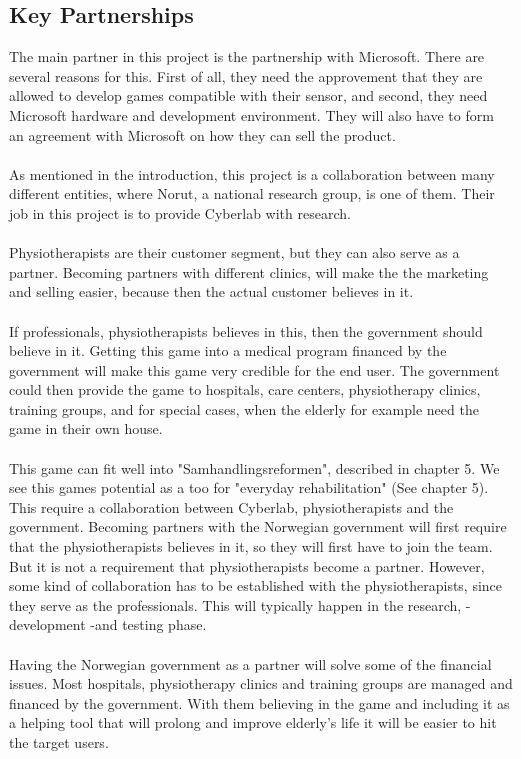 \subsection{Key Partnerships}
The main partner in this project is the partnership with Microsoft. There are several reasons for this. First of all, they need the approvement that they are allowed to develop games compatible with their sensor, and second, they need Microsoft hardware and development environment. They will also have to form an agreement with Microsoft on how they can sell the product. \\ \\ As mentioned in the introduction, this project is a collaboration between many different entities, where Norut, a national research group, is one of them. Their job in this project is to provide Cyberlab with research. \\ \\ Physiotherapists are their customer segment, but they can also serve as a partner. Becoming partners with different clinics, will make the the marketing and selling easier, because then the actual customer believes in it. \\ \\ If professionals, physiotherapists believes in this, then the government should believe in it. Getting this game into a medical program financed by the government will make this game very credible for the end user. The government could then provide the game to hospitals, care centers, physiotherapy clinics, training groups, and for special cases, when the elderly for example need the game in their own house. \\ \\ This game can fit well into "Samhandlingsreformen", described in chapter 5. We see this games potential as a too for "everyday rehabilitation" (See chapter 5). This require a collaboration between Cyberlab, physiotherapists and the government. Becoming partners with the Norwegian government will first require that the physiotherapists believes in it, so they will first have to join the team. But it is not a requirement that physiotherapists become a partner. However, some kind of collaboration has to be established with the physiotherapists, since they serve as the professionals. This will typically happen in the research, - development -and testing phase.  \\ \\ Having the Norwegian government as a partner will solve some of the financial issues. Most hospitals, physiotherapy clinics and training groups are managed and financed by the government. With them believing in the game and including it as a helping tool that will prolong and improve elderly's life it will be easier to hit the target users. 
